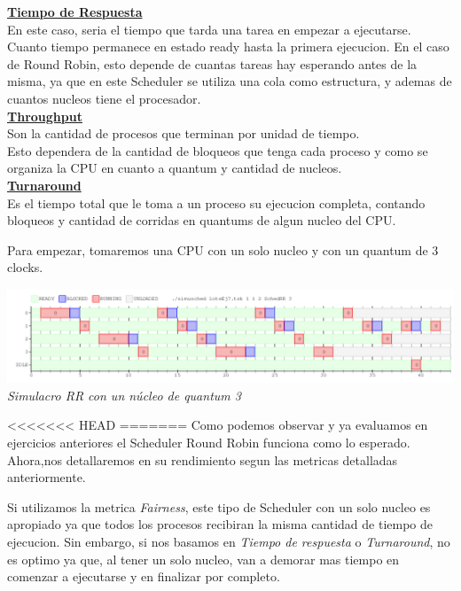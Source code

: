 \textbf{\underline{Tiempo de Respuesta}}\\
En este caso, seria el tiempo que tarda una tarea en empezar a ejecutarse.
Cuanto tiempo permanece en estado ready hasta la primera ejecucion.
En el caso de Round Robin, esto depende de cuantas tareas hay esperando antes de la misma, ya que en este Scheduler se utiliza una cola como estructura, y ademas de cuantos nucleos tiene el procesador.\\

\textbf{\underline{Throughput}}\\
Son la cantidad de procesos que terminan por unidad de tiempo.\\
Esto dependera de la cantidad de bloqueos que tenga cada proceso y como se organiza la CPU en cuanto a quantum y cantidad de nucleos.\\

\textbf{\underline{Turnaround}}\\
Es el tiempo total que le toma a un proceso su ejecucion completa, contando bloqueos y cantidad de corridas en quantums de algun nucleo del CPU.

\vspace{1 cm}
Para empezar, tomaremos una CPU con un solo nucleo y con un quantum de 3 clocks.\\

\vspace{\baselineskip}
\begin{center}
\includegraphics[scale=0.45]{../tp1/Test/resEj7Co1.png}
\\
\vspace{1pt}
\footnotesize\textit{Simulacro RR con un n\'ucleo de quantum 3}
\end{center}
\vspace{\baselineskip}

<<<<<<< HEAD
=======
Como podemos observar y ya evaluamos en ejercicios anteriores el Scheduler Round Robin funciona como lo esperado.
Ahora,nos detallaremos en su rendimiento segun las metricas detalladas anteriormente.

Si utilizamos la metrica \textit{Fairness}, este tipo de Scheduler con un solo nucleo es apropiado ya que todos los procesos recibiran la misma cantidad de tiempo de ejecucion.
Sin embargo, si nos basamos en \textit{Tiempo de respuesta} o \textit{Turnaround}, no es optimo ya que, al tener un solo nucleo, van a demorar mas tiempo en comenzar a ejecutarse y en finalizar por completo.

